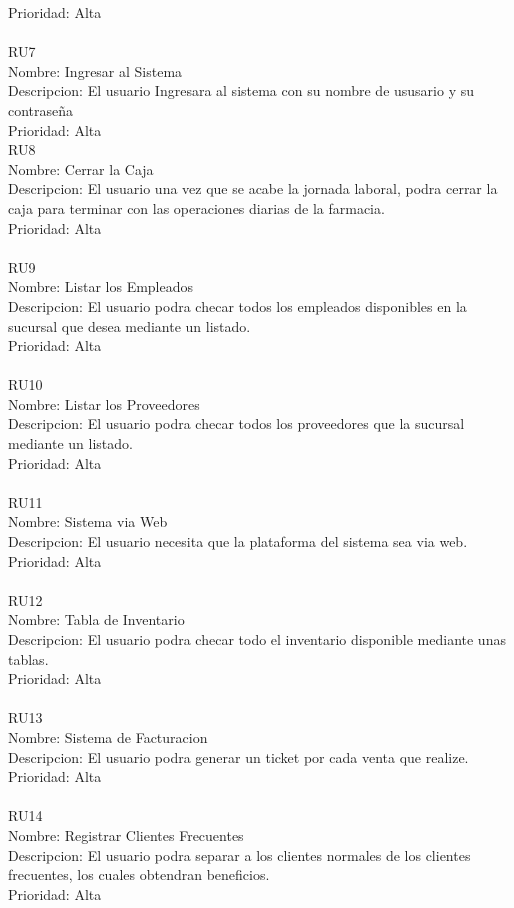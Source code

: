 Prioridad: Alta \\
\\
RU7\\
Nombre:  Ingresar al Sistema\\
Descripcion: El usuario Ingresara al sistema con su nombre de ususario y su contraseña\\
Prioridad: Alta \\
\newpage
RU8\\
Nombre:  Cerrar la Caja\\
Descripcion: El usuario una vez que se acabe la jornada laboral, podra cerrar la caja para terminar con las operaciones diarias de la farmacia.\\
Prioridad: Alta \\
\\
RU9\\
Nombre: Listar los Empleados \\
Descripcion: El usuario podra checar todos los empleados disponibles en la sucursal que desea mediante un listado.\\
Prioridad: Alta \\
\\
RU10\\
Nombre:  Listar los Proveedores\\
Descripcion: El usuario podra checar todos los proveedores que la sucursal mediante un listado.\\
Prioridad: Alta \\
\\
RU11\\
Nombre:  Sistema via Web\\
Descripcion: El usuario necesita que la plataforma del sistema sea via web.\\
Prioridad: Alta \\
\\
RU12\\
Nombre:  Tabla de Inventario\\
Descripcion: El usuario podra checar todo el inventario disponible mediante unas tablas.\\
Prioridad: Alta \\
\\
RU13\\
Nombre:  Sistema de Facturacion\\
Descripcion: El usuario podra generar un ticket por cada venta que realize.\\
Prioridad: Alta \\
\\
RU14\\
Nombre:  Registrar Clientes Frecuentes\\
Descripcion: El usuario podra separar a los clientes normales  de los clientes frecuentes, los cuales obtendran beneficios.\\
Prioridad: Alta \\
\\
\newpage
